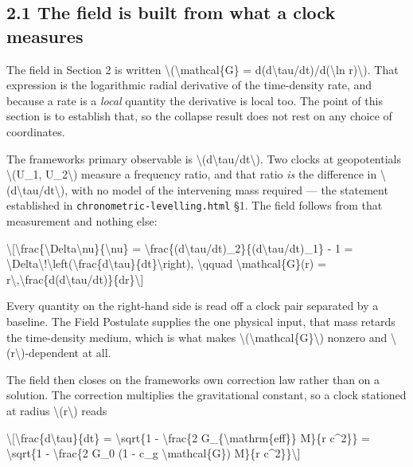 \documentclass[
  10pt,
]{article}
\begin{document}
\hypertarget{the-field-is-built-from-what-a-clock-measures}{%
\subsection{2.1 The field is built from what a clock
measures}\label{the-field-is-built-from-what-a-clock-measures}}

The field in Section 2 is written
\textbackslash(\textbackslash mathcal\{G\} =
d(d\textbackslash tau/dt)/d(\textbackslash ln r)\textbackslash). That
expression is the logarithmic radial derivative of the time-density
rate, and because a rate is a \emph{local} quantity the derivative is
local too. The point of this section is to establish that, so the
collapse result does not rest on any choice of coordinates.

The framework\textquotesingle s primary observable is
\textbackslash(d\textbackslash tau/dt\textbackslash). Two clocks at
geopotentials \textbackslash(U\_1, U\_2\textbackslash) measure a
frequency ratio, and that ratio \emph{is} the difference in
\textbackslash(d\textbackslash tau/dt\textbackslash), with no model of
the intervening mass required --- the statement established in
\texttt{chronometric-levelling.html} §1. The field follows from that
measurement and nothing else:

\textbackslash{[}\textbackslash frac\{\textbackslash Delta\textbackslash nu\}\{\textbackslash nu\}
=
\textbackslash frac\{(d\textbackslash tau/dt)\_2\}\{(d\textbackslash tau/dt)\_1\}
- 1 =
\textbackslash Delta\textbackslash!\textbackslash left(\textbackslash frac\{d\textbackslash tau\}\{dt\}\textbackslash right),
\textbackslash qquad \textbackslash mathcal\{G\}(r) =
r\textbackslash,\textbackslash frac\{d(d\textbackslash tau/dt)\}\{dr\}\textbackslash{]}

Every quantity on the right-hand side is read off a clock pair separated
by a baseline. The Field Postulate supplies the one physical input, that
mass retards the time-density medium, which is what makes
\textbackslash(\textbackslash mathcal\{G\}\textbackslash) nonzero and
\textbackslash(r\textbackslash)-dependent at all.

The field then closes on the framework\textquotesingle s own correction
law rather than on a solution. The correction multiplies the
gravitational constant, so a clock stationed at radius
\textbackslash(r\textbackslash) reads

\textbackslash{[}\textbackslash frac\{d\textbackslash tau\}\{dt\} =
\textbackslash sqrt\{1 - \textbackslash frac\{2
G\_\{\textbackslash mathrm\{eff\}\} M\}\{r c\^{}2\}\} =
\textbackslash sqrt\{1 - \textbackslash frac\{2 G\_0 (1 - c\_g
\textbackslash mathcal\{G\}) M\}\{r c\^{}2\}\}\textbackslash{]}
\end{document}
